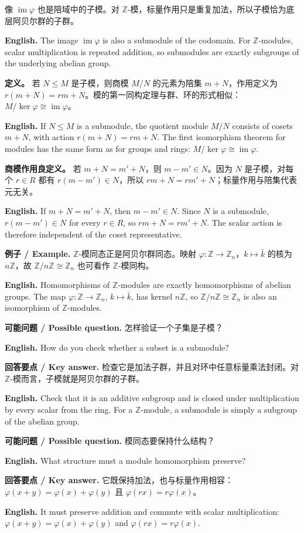 \documentclass[UTF8,11pt,a4paper]{ctexart}
\newcommand{\EN}[1]{\par\noindent\textbf{English.} #1\par}
\newcommand{\EX}[2]{\par\noindent\textbf{例子 / Example.} #1\par\EN{#2}}
\newcommand{\ASK}[4]{\par\noindent\textbf{可能问题 / Possible question.} #1\par\EN{#2}\noindent\textbf{回答要点 / Key answer.} #3\par\EN{#4}\medskip}
\begin{document}
\noindent 像 $\operatorname{im}\varphi$ 也是陪域中的子模。对 $\mathbb Z$-模，标量作用只是重复加法，所以子模恰为底层阿贝尔群的子群。
\EN{The image $\operatorname{im}\varphi$ is also a submodule of the codomain. For $\mathbb Z$-modules, scalar multiplication is repeated addition, so submodules are exactly subgroups of the underlying abelian group.}

\noindent\textbf{定义。} 若 $N\le M$ 是子模，则商模 $M/N$ 的元素为陪集 $m+N$，作用定义为 $r(m+N)=rm+N$。模的第一同构定理与群、环的形式相似：$M/\ker\varphi\cong\operatorname{im}\varphi$。

\EN{If $N\le M$ is a submodule, the quotient module $M/N$ consists of cosets $m+N$, with action $r(m+N)=rm+N$. The first isomorphism theorem for modules has the same form as for groups and rings: $M/\ker\varphi\cong\operatorname{im}\varphi$.}

\noindent\textbf{商模作用良定义。} 若 $m+N=m'+N$，则 $m-m'\in N$。因为 $N$ 是子模，对每个 $r\in R$ 都有 $r(m-m')\in N$，所以 $rm+N=rm'+N$；标量作用与陪集代表元无关。
\EN{If $m+N=m'+N$, then $m-m'\in N$. Since $N$ is a submodule, $r(m-m')\in N$ for every $r\in R$, so $rm+N=rm'+N$. The scalar action is therefore independent of the coset representative.}

\EX{$\mathbb Z$-模同态正是阿贝尔群同态。映射 $\varphi:\mathbb Z\to\mathbb Z_n$，$k\mapsto\bar k$ 的核为 $n\mathbb Z$，故 $\mathbb Z/n\mathbb Z\cong\mathbb Z_n$ 也可看作 $\mathbb Z$-模同构。}{Homomorphisms of $\mathbb Z$-modules are exactly homomorphisms of abelian groups. The map $\varphi:\mathbb Z\to\mathbb Z_n$, $k\mapsto\bar k$, has kernel $n\mathbb Z$, so $\mathbb Z/n\mathbb Z\cong\mathbb Z_n$ is also an isomorphism of $\mathbb Z$-modules.}

\ASK{怎样验证一个子集是子模？}{How do you check whether a subset is a submodule?}{检查它是加法子群，并且对环中任意标量乘法封闭。对 $\mathbb Z$-模而言，子模就是阿贝尔群的子群。}{Check that it is an additive subgroup and is closed under multiplication by every scalar from the ring. For a $\mathbb Z$-module, a submodule is simply a subgroup of the abelian group.}

\ASK{模同态要保持什么结构？}{What structure must a module homomorphism preserve?}{它既保持加法，也与标量作用相容：$\varphi(x+y)=\varphi(x)+\varphi(y)$ 且 $\varphi(rx)=r\varphi(x)$。}{It must preserve addition and commute with scalar multiplication: $\varphi(x+y)=\varphi(x)+\varphi(y)$ and $\varphi(rx)=r\varphi(x)$.}
\end{document}
